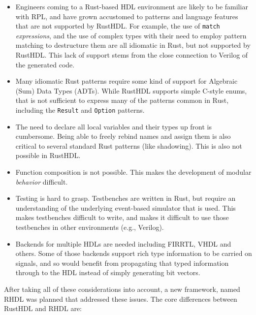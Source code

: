 \documentclass[conference]{IEEEtran}
\begin{document}
\begin{itemize}
  \item Engineers coming to a Rust-based HDL environment are likely to be familiar with RPL,
  and have grown accustomed to patterns and language features that are not supported by RustHDL.  For example, the 
  use of \verb|match| \emph{expressions}, and the use of complex types with their need to employ pattern matching to destructure 
  them are all idiomatic in Rust, but not supported by RustHDL.  This lack of support stems from the close 
  connection to Verilog of the generated code.
  \item Many idiomatic Rust patterns require some kind of support for Algebraic (Sum) Data Types (ADTs).  While RustHDL
  supports simple C-style enums, that is not sufficient to express many of the patterns common in Rust, including the 
  \verb|Result| and \verb|Option| patterns.
  \item The need to declare all local variables and their types up front is cumbersome.  Being able to freely rebind
  names and assign them is also critical to several standard Rust patterns (like shadowing).  This is also not
  possible in RustHDL.
  \item Function composition is not possible.  This makes the development of modular \emph{behavior} difficult.
  \item Testing is hard to grasp.  Testbenches are written in Rust, but require an understanding of the underlying
  event-based simulator that is used.  This makes testbenches difficult to write, and makes it difficult to use those
  testbenches in other environments (e.g., Verilog).
  \item Backends for multiple HDLs are needed including FIRRTL, VHDL and others.  Some of those backends support
  rich type information to be carried on signals, and so would benefit from propagating that typed information through
  to the HDL instead of simply generating bit vectors.
\end{itemize}

After taking all of these considerations into account, a new framework, named RHDL was planned that addressed these issues.  The 
core differences between RustHDL and RHDL are:
\end{document}
